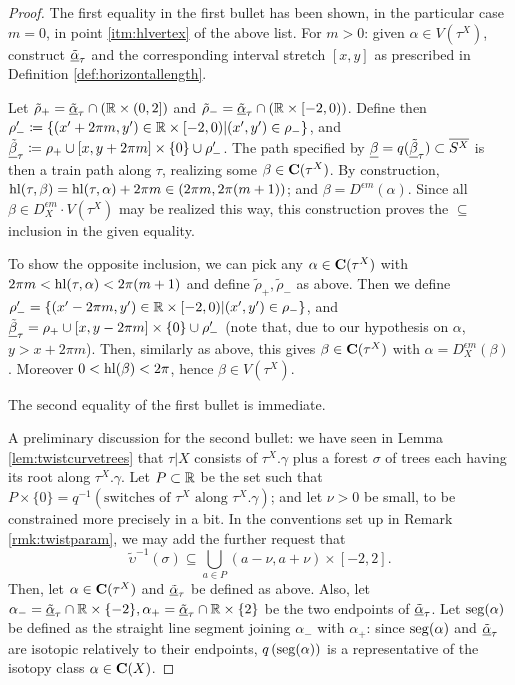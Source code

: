 \begin{proof}
The first equality in the first bullet has been shown, in the particular case $m=0$, in point \ref{itm:hlvertex} of the above list. For $m>0$: given $\alpha\in V(\tau^X)$, construct $\underline{\tilde\alpha}_\tau$ and the corresponding interval stretch $[x,y]$ as prescribed in Definition \ref{def:horizontallength}.

Let $\tilde\rho_+=\underline{\tilde\alpha}_\tau\cap(\mathbb R\times(0,2])$ and $\tilde\rho_-=\underline{\tilde\alpha}_\tau\cap(\mathbb R\times[-2,0))$. Define then $\rho'_-\coloneqq\{(x'+2\pi m,y')\in\mathbb R\times[-2,0)|(x',y')\in \rho_-\}$, and $\underline{\tilde\beta}_\tau\coloneqq\rho_+\cup [x,y+2\pi m]\times\{0\}\cup \rho'_-$. The path specified by $\underline{\beta}=q(\underline{\tilde\beta}_\tau)\subset\overline{S^X}$ is then a train path along $\tau$, realizing some $\beta\in \mathbf C(\tau^X)$. By construction, $\mathrm{hl}(\tau,\beta)=\mathrm{hl}(\tau,\alpha)+2\pi m\in (2\pi m, 2\pi(m+1))$; and $\beta=D^{\epsilon m}(\alpha)$. Since all $\beta\in D_X^{\epsilon m}\cdot V(\tau^X)$ may be realized this way, this construction proves the $\subseteq$ inclusion in the given equality.

To show the opposite inclusion, we can pick any $\alpha\in\mathbf C(\tau^X)$ with $2\pi m<\mathrm{hl}(\tau,\alpha)<2\pi(m+1)$ and define $\tilde\rho_+,\tilde\rho_-$ as above. Then we define $\rho_-'=\{(x'-2\pi m,y')\in\mathbb R\times[-2,0)|(x',y')\in \rho_-\}$, and  $\underline{\tilde\beta}_\tau=\rho_+\cup [x,y-2\pi m]\times\{0\}\cup \rho'_-$ (note that, due to our hypothesis on $\alpha$, $y>x+2\pi m$). Then, similarly as above, this gives $\beta\in \mathbf C(\tau^X)$ with $\alpha=D_X^{\epsilon m}(\beta)$. Moreover $0<\mathrm{hl}(\beta)<2\pi$, hence $\beta\in V(\tau^X)$.

The second equality of the first bullet is immediate.

A preliminary discussion for the second bullet: we have seen in Lemma \ref{lem:twistcurvetrees} that $\tau|X$ consists of $\tau^X.\gamma$ plus a forest $\sigma$ of trees each having its root along $\tau^X.\gamma$. Let $P\subset \mathbb R$ be the set such that $P\times \{0\}=q^{-1}(\text{switches of }\tau^X\text{ along }\tau^X.\gamma)$; and let $\nu>0$ be small, to be constrained more precisely in a bit. In the conventions set up in Remark \ref{rmk:twistparam}, we may add the further request that
$$\tilde\upsilon^{-1}(\sigma)\subseteq \bigcup_{a\in P} (a-\nu,a+\nu)\times[-2,2].$$
Then, let $\alpha\in\mathbf C(\tau^X)$ and $\underline{\tilde\alpha}_\tau$ be defined as above. Also, let $\alpha_-=\underline{\tilde\alpha}_\tau\cap \mathbb R\times\{-2\}, \alpha_+=\underline{\tilde\alpha}_\tau\cap \mathbb R\times\{2\}$ be the two endpoints of $\underline{\tilde\alpha}_\tau$. Let $\mathrm{seg}(\alpha)$ be defined as the straight line segment joining $\alpha_-$ with $\alpha_+$: since $\mathrm{seg}(\alpha)$ and $\underline{\tilde\alpha}_\tau$ are isotopic relatively to their endpoints, $q\left(\mathrm{seg}(\alpha)\right)$ is a representative of the isotopy class $\alpha\in\mathbf C(X)$.


\end{proof}
